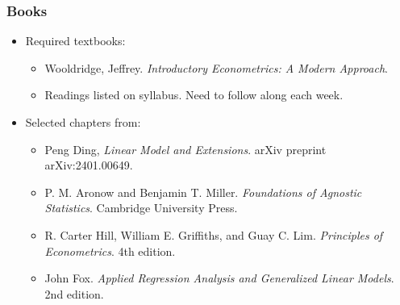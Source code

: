 \documentclass[xcolor=svgnames,9pt,english,aspectratio=169,t]{beamer}
\begin{document}
\begin{frame}
  \frametitle{Books}
  \begin{itemize}
  \item Required textbooks:
  \begin{itemize}\small
  \item  Wooldridge, Jeffrey. \emph{Introductory Econometrics: A Modern Approach}.
  \item Readings listed on syllabus. Need to follow along each week.
  \end{itemize}\medskip
\item Selected chapters from:
  \begin{itemize}\small
\item Peng Ding, \emph{Linear Model and Extensions}. arXiv preprint arXiv:2401.00649.    
\item P. M. Aronow and Benjamin T. Miller. \emph{Foundations of Agnostic Statistics}. Cambridge University Press.    
\item R. Carter Hill, William E. Griffiths, and Guay C. Lim. \emph{Principles of Econometrics}. 4th edition.
\item John Fox. \emph{Applied Regression Analysis and Generalized Linear Models}. 2nd edition.
\end{itemize}
\medskip
\end{itemize}
\end{frame}
\end{document}
